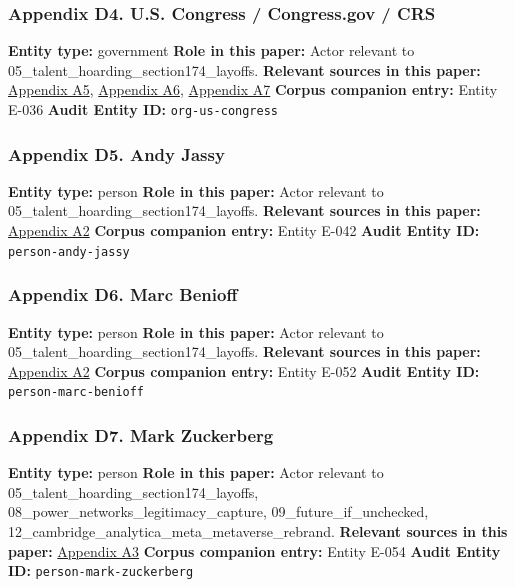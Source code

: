 \documentclass[
  american,
  11pt,
  letterpaper,
]{article}
\begin{document}
\subsubsection{Appendix D4. U.S. Congress / Congress.gov /
CRS}\label{appendix-d4-u-s-congress-congress-gov-crs}

\textbf{Entity type:} government \textbf{Role in this paper:} Actor
relevant to 05\_talent\_hoarding\_section174\_layoffs. \textbf{Relevant
sources in this paper:}
\hyperref[appendix-a5-h-r-7024-tax-relief-for-american-families-and-workers-act-of-2024]{Appendix
A5},
\hyperref[appendix-a6-h-r-7024-tax-relief-for-american-families-and-workers-act-of-2024-crs-summary]{Appendix
A6},
\hyperref[appendix-a7-h-r-7024-text-deduction-for-domestic-research-and-experimental-expenditures]{Appendix
A7} \textbf{Corpus companion entry:} Entity E-036 \textbf{Audit Entity
ID:} \texttt{org-us-congress}

\subsubsection{Appendix D5. Andy Jassy}\label{appendix-d5-andy-jassy}

\textbf{Entity type:} person \textbf{Role in this paper:} Actor relevant
to 05\_talent\_hoarding\_section174\_layoffs. \textbf{Relevant sources
in this paper:}
\hyperref[appendix-a2-amazon-salesforce-jettison-jobs-in-latest-tech-worker-purge]{Appendix
A2} \textbf{Corpus companion entry:} Entity E-042 \textbf{Audit Entity
ID:} \texttt{person-andy-jassy}

\subsubsection{Appendix D6. Marc
Benioff}\label{appendix-d6-marc-benioff}

\textbf{Entity type:} person \textbf{Role in this paper:} Actor relevant
to 05\_talent\_hoarding\_section174\_layoffs. \textbf{Relevant sources
in this paper:}
\hyperref[appendix-a2-amazon-salesforce-jettison-jobs-in-latest-tech-worker-purge]{Appendix
A2} \textbf{Corpus companion entry:} Entity E-052 \textbf{Audit Entity
ID:} \texttt{person-marc-benioff}

\subsubsection{Appendix D7. Mark
Zuckerberg}\label{appendix-d7-mark-zuckerberg}

\textbf{Entity type:} person \textbf{Role in this paper:} Actor relevant
to 05\_talent\_hoarding\_section174\_layoffs,
08\_power\_networks\_legitimacy\_capture, 09\_future\_if\_unchecked,
12\_cambridge\_analytica\_meta\_metaverse\_rebrand. \textbf{Relevant
sources in this paper:}
\hyperref[appendix-a3-mark-zuckerberg-s-message-to-meta-employees]{Appendix
A3} \textbf{Corpus companion entry:} Entity E-054 \textbf{Audit Entity
ID:} \texttt{person-mark-zuckerberg}
\end{document}

